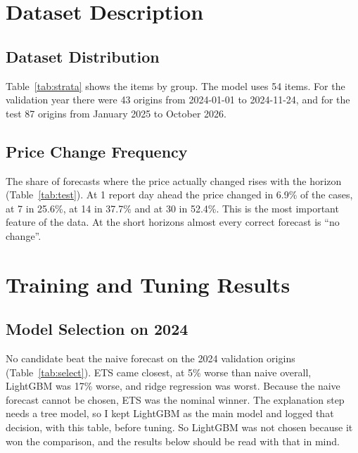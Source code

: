 \section{Dataset Description}

\subsection{Dataset Distribution}
Table~\ref{tab:strata} shows the items by group. The model uses 54 items. For the validation year there were 43 origins from 2024-01-01 to 2024-11-24, and for the test 87 origins from January 2025 to October 2026.

\subsection{Price Change Frequency}
The share of forecasts where the price actually changed rises with the horizon (Table~\ref{tab:test}). At 1 report day ahead the price changed in 6.9\% of the cases, at 7 in 25.6\%, at 14 in 37.7\% and at 30 in 52.4\%. This is the most important feature of the data. At the short horizons almost every correct forecast is ``no change''.

\section{Training and Tuning Results}

\subsection{Model Selection on 2024}
No candidate beat the naive forecast on the 2024 validation origins (Table~\ref{tab:select}). ETS came closest, at 5\% worse than naive overall, LightGBM was 17\% worse, and ridge regression was worst. Because the naive forecast cannot be chosen, ETS was the nominal winner. The explanation step needs a tree model, so I kept LightGBM as the main model and logged that decision, with this table, before tuning. So LightGBM was not chosen because it won the comparison, and the results below should be read with that in mind.

\begin{table}[H]\centering\small
\caption[Validation on 2024, six candidate models]{Validation on 2024, 43 origins, all four horizons. Lower is better; relative error 1.000 is a tie with ``tomorrow equals today''.}\label{tab:select}

\par{}
\end{table}

